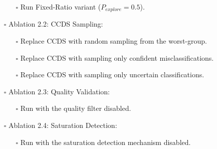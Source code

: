 \begin{itemize}
\begin{itemize}
        \item[$\square$] Run Fixed-Ratio variant ($P_{explore}=0.5$).
    \end{itemize}
    \item[$\square$] Ablation 2.2: CCDS Sampling:
     \begin{itemize}
        \item[$\square$] Replace CCDS with random sampling from the worst-group.
        \item[$\square$] Replace CCDS with sampling only confident misclassifications.
        \item[$\square$] Replace CCDS with sampling only uncertain classifications.
    \end{itemize}
    \item[$\square$] Ablation 2.3: Quality Validation:
    \begin{itemize}
        \item[$\square$] Run \system with the quality filter disabled.
    \end{itemize}
    \item[$\square$] Ablation 2.4: Saturation Detection:
    \begin{itemize}
        \item[$\square$] Run \system with the saturation detection mechanism disabled.
    \end{itemize}
\end{itemize}
